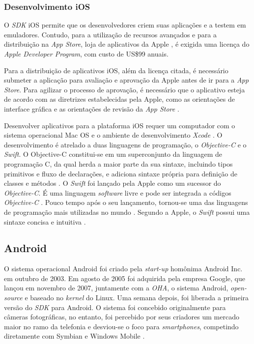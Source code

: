 \subsubsection{Desenvolvimento iOS} \label{subsubsection-dev-ios}

O \textit{SDK} iOS permite que os desenvolvedores criem suas aplicações e a testem em emuladores. 
Contudo, para a utilização de recursos avançados e para a distribuição 
na \textit{App Store}, loja de aplicativos da Apple \cite{apple_inc_program_2016}, é exigida uma licença do \textit{Apple Developer Program}, com custo de US\$99 anuais.   

Para a distribuição de aplicativos iOS, além da licença citada, é necessário submeter a aplicação para avaliação e aprovação da Apple antes de ir para a \textit{App Store}. 
Para agilizar o processo de aprovação, é necessário que o aplicativo esteja de acordo com as diretrizes estabelecidas pela Apple, como as orientações de interface gráfica e as orientações de revisão da \textit{App Store} \cite{apple_inc_submitting_2016}.

Desenvolver aplicativos para a plataforma iOS requer um computador com o sistema operacional Mac OS e o ambiente de desenvolvimento \textit{Xcode} \cite{heitkotter_evaluating_2013}. 
O desenvolvimento é atrelado a duas linguagens de programação, o \textit{Objective-C} e o \textit{Swift}.
O Objective-C constitui-se em um superconjunto da linguagem de programação C, da qual herda a maior parte da sua sintaxe, incluindo tipos primitivos e fluxo de declarações, e adiciona sintaxe própria para definição de classes e métodos \cite{apple_inc_about_2014}. 
O \textit{Swift} foi lançado pela Apple como um sucessor do \textit{Objective-C}. É uma linguagem \textit{software} livre e pode ser integrada a códigos \textit{Objective-C} \cite{apple_inc_swift_2016}. Pouco tempo após o seu lançamento, tornou-se uma das linguagens de programação mais utilizadas no mundo \cite{rebouas_empirical_2016}. Segundo a Apple, o \textit{Swift} possui uma sintaxe concisa e intuitiva \cite{apple_inc_swift_2016}.

\subsection{Android} \label{subsection:android}

O sistema operacional Android foi criado pela \textit{start-up} homônima Android Inc. em outubro de 2003. Em agosto de 2005 foi adquirida pela empresa Google, que lançou
em novembro de 2007, juntamente com a \textit{OHA}, o sistema Android, \textit{open-source} e baseado no \textit{kernel} do Linux. Uma semana depois, foi liberada a primeira versão do \textit{SDK} para Android.
O sistema foi concebido originalmente para câmeras fotográficas, no entanto, foi percebido por seus criadores um mercado maior no ramo da telefonia e desviou-se o 
foco para \textit{smartphones}, competindo diretamente com Symbian e Windows Mobile \cite{papajorgji_automated_2015}.

